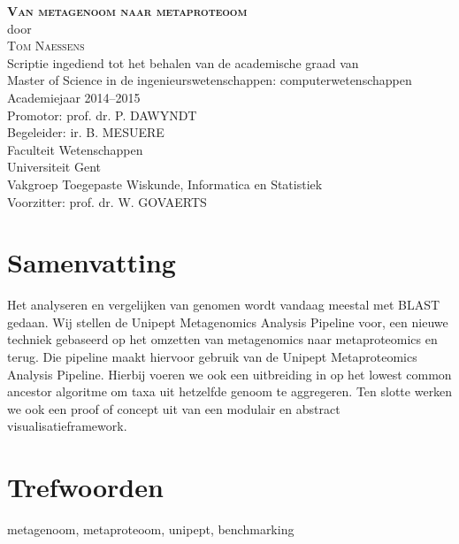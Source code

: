 \documentclass[12pt,a4paper,dutch]{report}
\theoremstyle{definition}
\newcommand\blankpage{%
    \null
    \thispagestyle{empty}%
    \addtocounter{page}{-1}%
    \newpage}
\begin{document}
\begin{titlepage}

\begin{center}
    \textbf{\textsc{\LARGE Van metagenoom naar metaproteoom}}\\[0.5cm]
    
    door\\[0.5cm]
    
    \textsc{\Large Tom Naessens}\\[0.5cm]
    
    Scriptie ingediend tot het behalen van de academische graad van\\
    Master of Science in de ingenieurswetenschappen: 
    computerwetenschappen\\[0.5cm]
    
    Academiejaar 2014--2015\\[0.5cm]
    
    Promotor: prof. dr. P. DAWYNDT\\
    Begeleider: ir. B. MESUERE\\
    Faculteit Wetenschappen\\
    Universiteit Gent\\[0.5cm]
    
    Vakgroep Toegepaste Wiskunde, Informatica en Statistiek\\
    Voorzitter: prof. dr. W. GOVAERTS
    \end{center}
    
\section*{Samenvatting} 

Het analyseren en vergelijken van genomen wordt vandaag meestal met BLAST
gedaan. Wij stellen de Unipept Metagenomics Analysis Pipeline voor, een nieuwe
techniek gebaseerd op het omzetten van metagenomics naar metaproteomics en
terug. Die pipeline maakt hiervoor gebruik van de Unipept Metaproteomics
Analysis Pipeline. Hierbij voeren we ook een uitbreiding in op het lowest common
ancestor algoritme om taxa uit hetzelfde genoom te aggregeren. Ten slotte werken
we ook een proof of concept uit van een modulair en abstract
visualisatieframework.

\section*{Trefwoorden}
metagenoom, metaproteoom, unipept, benchmarking
\end{titlepage}


\clearpage



\tableofcontents

\clearpage
{}

\pagestyle{fancy}







\printbibliography


\afterpage{\blankpage}
\end{document}
